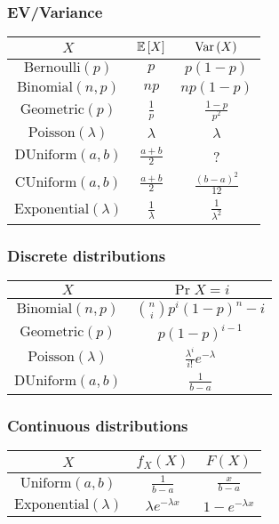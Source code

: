 \subsubsection{EV/Variance}
\begin{center}
    \begin{tabular}{|c|c|c|}
        \hline 
        $X$ & $\mathbb{E}\left[ X \right]$ & $\text{Var}\left( X \right)$ \\
        \hline
        $\text{Bernoulli}(p)$ & $p$ & $p(1-p)$ \\
        \hline
        $\text{Binomial}(n,p)$ & $np$ & $np(1-p)$ \\
        \hline
        $\text{Geometric}(p)$ & $\frac{1}{p}$ & $\frac{1-p}{p^2}$ \\
        \hline
        $\text{Poisson}(\lambda)$ & $\lambda$ & $\lambda$ \\
        \hline
        $\text{DUniform}(a,b)$ & $\frac{a+b}{2}$ & ? \\
        \hline
        $\text{CUniform}(a,b)$ & $\frac{a+b}{2}$ & $\frac{(b-a)^2}{12}$ \\
        \hline
        $\text{Exponential}(\lambda)$ & $\frac{1}{\lambda}$ & $\frac{1}{\lambda^2}$ \\
        \hline
    \end{tabular}
\end{center}

\subsubsection{Discrete distributions}
\begin{center}
    \begin{tabular}{|c|c|}
        \hline 
        $X$ & $\Pr{X = i}$ \\
        \hline
        $\text{Binomial}(n,p)$ & $\binom{n}{i} p^i (1-p)^n-i$ \\
        \hline
        $\text{Geometric}(p)$ & $p(1-p)^{i-1}$ \\
        \hline
        $\text{Poisson}(\lambda)$ & $\frac{\lambda^i}{i!}e^{-\lambda}$ \\
        \hline
        $\text{DUniform}(a,b)$ & $\frac{1}{b-a}$ \\
        \hline
    \end{tabular}
\end{center}

\subsubsection{Continuous distributions}
\begin{center}
    \begin{tabular}{|c|c|c|}
        \hline
        $X$ & $f_X(X)$ & $F(X)$ \\
        \hline 
        $\text{Uniform}(a,b)$ & $\frac{1}{b-a}$ & $\frac{x}{b-a}$ \\
        \hline
        $\text{Exponential}(\lambda)$ & $\lambda e^{-\lambda x}$ & $1 - e^{-\lambda x}$ \\
        \hline
    \end{tabular}
\end{center}